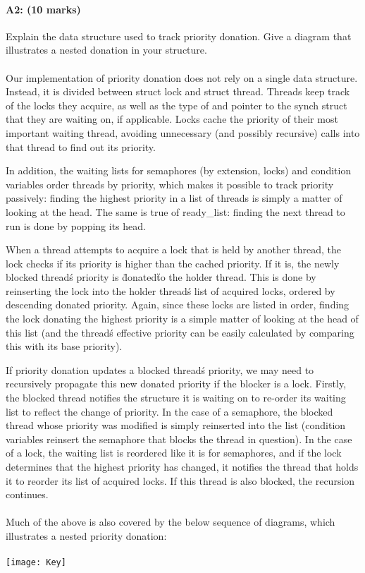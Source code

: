 \paragraph{A2: (10 marks)}
Explain the data structure used to track priority donation. Give a diagram that illustrates a nested donation in your structure.
\\
\\
Our implementation of priority donation does not rely on a single data structure. Instead, it is divided between struct lock and struct thread. Threads keep track of the locks they acquire, as well as the type of and pointer to the synch struct that they are waiting on, if applicable. Locks cache the priority of their most important waiting thread, avoiding unnecessary (and possibly recursive) calls into that thread to find out its priority.

In addition, the waiting lists for semaphores (by extension, locks) and condition variables order threads by priority, which makes it possible to track priority passively: finding the highest priority in a list of threads is simply a matter of looking at the head. The same is true of ready\_list: finding the next thread to run is done by popping its head.

When a thread attempts to acquire a lock that is held by another thread, the lock checks if its priority is higher than the cached priority. If it is, the newly blocked thread\'s priority is \"donated\" to the holder thread. This is done by reinserting the lock into the holder thread\'s list of acquired locks, ordered by descending donated priority. Again, since these locks are listed in order, finding the lock donating the highest priority is a simple matter of looking at the head of this list (and the thread\'s effective priority can be easily calculated by comparing this with its base priority).

If priority donation updates a blocked thread\'s priority, we may need to recursively propagate this new donated priority if the blocker is a lock. Firstly, the blocked thread notifies the structure it is waiting on to re-order its waiting list to reflect the change of priority.
In the case of a semaphore, the blocked thread whose priority was modified is simply reinserted into the list (condition variables reinsert the semaphore that blocks the thread in question).
In the case of a lock, the waiting list is reordered like it is for semaphores, and if the lock determines that the highest priority has changed, it notifies the thread that holds it to reorder its list of acquired locks. If this thread is also blocked, the recursion continues.
\\
\\
Much of the above is also covered by the below sequence of diagrams, which illustrates a nested priority donation:
\\
\\
\texttt{[image: Key]}

